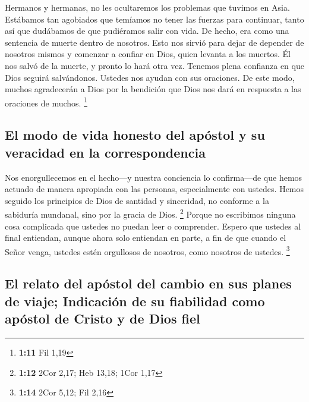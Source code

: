  Hermanos y hermanas, no les ocultaremos los problemas que
tuvimos en Asia. Estábamos tan agobiados que temíamos no tener las
fuerzas para continuar, tanto así que dudábamos de que pudiéramos salir
con vida.  De hecho, era como una sentencia de muerte
dentro de nosotros. Esto nos sirvió para dejar de depender de nosotros
mismos y comenzar a confiar en Dios, quien levanta a los muertos.
 Él nos salvó de la muerte, y pronto lo hará otra vez.
Tenemos plena confianza en que Dios seguirá salvándonos. 
Ustedes nos ayudan con sus oraciones. De este modo, muchos agradecerán a
Dios por la bendición que Dios nos dará en respuesta a las oraciones de
muchos. \footnote{\textbf{1:11} Fil 1,19}

\hypertarget{el-modo-de-vida-honesto-del-apuxf3stol-y-su-veracidad-en-la-correspondencia}{%
\subsection{El modo de vida honesto del apóstol y su veracidad en la
correspondencia}\label{el-modo-de-vida-honesto-del-apuxf3stol-y-su-veracidad-en-la-correspondencia}}

 Nos enorgullecemos en el hecho---y nuestra conciencia lo
confirma---de que hemos actuado de manera apropiada con las personas,
especialmente con ustedes. Hemos seguido los principios de Dios de
santidad y sinceridad, no conforme a la sabiduría mundanal, sino por la
gracia de Dios. \footnote{\textbf{1:12} 2Cor 2,17; Heb 13,18; 1Cor 1,17}
 Porque no escribimos ninguna cosa complicada que ustedes
no puedan leer o comprender. Espero que ustedes al final entiendan,
 aunque ahora solo entiendan en parte, a fin de que
cuando el Señor venga, ustedes estén orgullosos de nosotros, como
nosotros de ustedes. \footnote{\textbf{1:14} 2Cor 5,12; Fil 2,16}

\hypertarget{el-relato-del-apuxf3stol-del-cambio-en-sus-planes-de-viaje-indicaciuxf3n-de-su-fiabilidad-como-apuxf3stol-de-cristo-y-de-dios-fiel}{%
\subsection{El relato del apóstol del cambio en sus planes de viaje;
Indicación de su fiabilidad como apóstol de Cristo y de Dios
fiel}\label{el-relato-del-apuxf3stol-del-cambio-en-sus-planes-de-viaje-indicaciuxf3n-de-su-fiabilidad-como-apuxf3stol-de-cristo-y-de-dios-fiel}}

